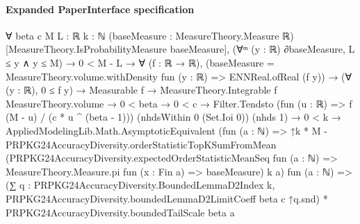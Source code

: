 \documentclass[10pt]{article}
\begin{document}
\paragraph{Expanded PaperInterface specification}
\begin{ReviewVerbatim}
∀ {beta c M L : ℝ} {k : ℕ} (baseMeasure : MeasureTheory.Measure ℝ) [MeasureTheory.IsProbabilityMeasure baseMeasure],
  (∀ᵐ (y : ℝ) ∂baseMeasure, L ≤ y ∧ y ≤ M) →
    0 < M - L →
      ∀ (f : ℝ → ℝ),
        (baseMeasure = MeasureTheory.volume.withDensity fun (y : ℝ) => ENNReal.ofReal (f y)) →
          (∀ (y : ℝ), 0 ≤ f y) →
            Measurable f →
              MeasureTheory.Integrable f MeasureTheory.volume →
                0 < beta →
                  0 < c →
                    Filter.Tendsto (fun (u : ℝ) => f (M - u) / (c * u ^ (beta - 1))) (nhdsWithin 0 (Set.Ioi 0))
                        (nhds 1) →
                      0 < k →
                        AppliedModelingLib.Math.AsymptoticEquivalent
                          (fun (a : ℕ) =>
                            ↑k * M -
                              PRPKG24AccuracyDiversity.orderStatisticTopKSumFromMean
                                (PRPKG24AccuracyDiversity.expectedOrderStatisticMeanSeq fun (a : ℕ) =>
                                  MeasureTheory.Measure.pi fun (x : Fin a) => baseMeasure)
                                k a)
                          fun (a : ℕ) =>
                          (∑ q : PRPKG24AccuracyDiversity.BoundedLemmaD2Index k,
                              PRPKG24AccuracyDiversity.boundedLemmaD2LimitCoeff beta c ↑q.snd) *
                            PRPKG24AccuracyDiversity.boundedTailScale beta a
\end{ReviewVerbatim}
\end{document}
